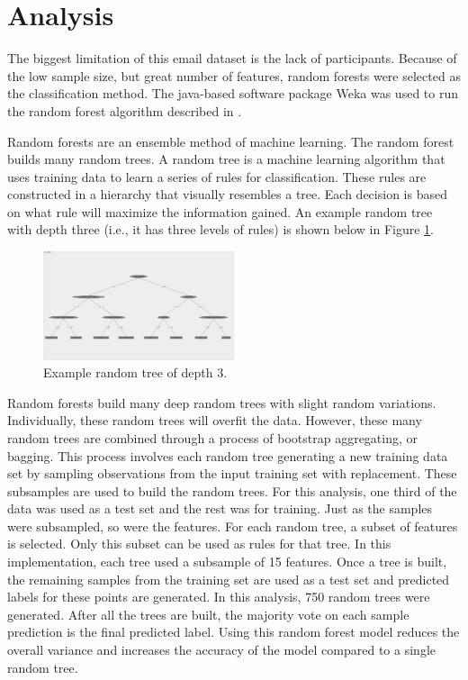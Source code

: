 \documentclass{article}
\begin{document}
\section{Analysis} \label{Analysis}
The biggest limitation of this email dataset is the lack of participants.  Because of the low sample size, but great number of features, random forests were selected as the classification method.  The java-based software package Weka was used to run the random forest algorithm described in \cite{Breiman2001}.
\par
Random forests are an ensemble method of machine learning.  The random forest builds many random trees.  A random tree is a machine learning algorithm that uses training data to learn a series of rules for classification.  These rules are constructed in a hierarchy that visually resembles a tree.  Each decision is based on what rule will maximize the information gained.  An example random tree with depth three (i.e., it has three levels of rules) is shown below in Figure \ref{fig:ex_tree}.
\begin{figure}[H]
    \centering
        \includegraphics[width=0.5\textwidth]{3_level_tree}
        \caption{Example random tree of depth 3.}
        \label{fig:ex_tree}
\end{figure}
\par
Random forests build many deep random trees with slight random variations.  Individually, these random trees will overfit the data.  However, these many random trees are combined through a process of bootstrap aggregating, or bagging.  This process involves each random tree generating a new training data set by sampling observations from the input training set with replacement.  These subsamples are used to build the random trees.  For this analysis, one third of the data was used as a test set and the rest was for training.  Just as the samples were subsampled, so were the features.  For each random tree, a subset of features is selected.  Only this subset can be used as rules for that tree.  In this implementation, each tree used a subsample of 15 features. Once a tree is built, the remaining samples from the training set are used as a test set and predicted labels for these points are generated. In this analysis, 750 random trees were generated. After all the trees are built, the majority vote on each sample prediction is the final predicted label.  Using this random forest model reduces the overall variance and increases the accuracy of the model compared to a single random tree.
\end{document}
